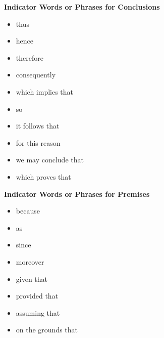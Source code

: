 \documentclass[11pt, fleqn]{article}
\begin{document}
\textbf{Indicator Words or Phrases for Conclusions}
\begin{itemize}
    \item thus
    \item hence
    \item therefore
    \item consequently
    \item which implies that
    \item so
    \item it follows that
    \item for this reason
    \item we may conclude that
    \item which proves that
\end{itemize}
\textbf{Indicator Words or Phrases for Premises}
\begin{itemize}
    \item because
    \item as
    \item since
    \item moreover
    \item given that
    \item provided that
    \item assuming that
    \item on the grounds that
\end{itemize}
\end{document}
